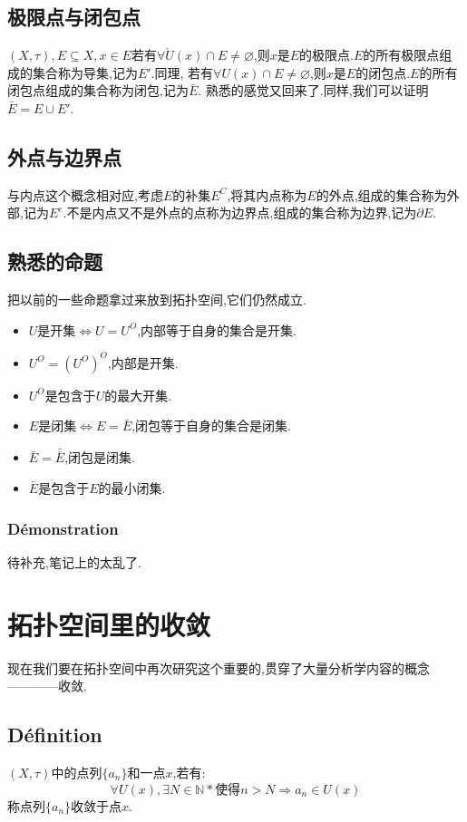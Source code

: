 \documentclass[12pt, a4paper, oneside]{ctexbook}
\begin{document}
  \subsection{极限点与闭包点}
  $(X,\tau), E\subseteq X,x\in E$若有$\forall\check{U}(x)\cap E\neq\varnothing$,则$x$是$E$的极限点.$E$的所有极限点组成的集合称为导集,记为$E'$.同理,
  若有$\forall U(x)\cap E\neq\varnothing$,则$x$是$E$的闭包点.$E$的所有闭包点组成的集合称为闭包,记为$\bar{E}$.
  熟悉的感觉又回来了.同样,我们可以证明$\bar{E}=E\cup E'$.
  \subsection{外点与边界点}
  与内点这个概念相对应,考虑$E$的补集$E^C$,将其内点称为$E$的外点,组成的集合称为外部,记为$E^e$.不是内点又不是外点的点称为边界点,组成的集合称为边界,记为$\partial E$.
  \subsection{熟悉的命题}
  把以前的一些命题拿过来放到拓扑空间,它们仍然成立.
  \begin{itemize}
    \item $U\text{是开集}\Leftrightarrow U=U^O$,内部等于自身的集合是开集.
    \item $U^O=(U^O)^O$,内部是开集.
    \item $U^O$是包含于$U$的最大开集.
    \item $E\text{是闭集}\Leftrightarrow E=\bar{E}$,闭包等于自身的集合是闭集.
    \item $\bar{E}=\bar{\bar{E}}$,闭包是闭集.
    \item $\bar{E}$是包含于$E$的最小闭集.
  \end{itemize}
  \subsubsection{Démonstration}
  待补充,笔记上的太乱了.



\section{拓扑空间里的收敛}
  现在我们要在拓扑空间中再次研究这个重要的,贯穿了大量分析学内容的概念————收敛.
  \subsection{Définition}
  $(X,\tau)$中的点列$\{a_n\}$和一点$x$,若有:
  $$
  \forall U(x), \exists N\in \mathbb{N}*\text{使得}n>N\Rightarrow a_n\in U(x)
  $$
  称点列$\{a_n\}$收敛于点$x$.
\end{document}
